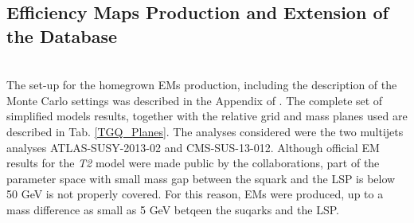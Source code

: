 \documentclass[a4paper,11pt]{article}
\begin{document}
\subsection{Efficiency Maps Production and Extension of the Database}
\\
The set-up for the homegrown EMs production, including the description of the Monte Carlo settings was described in the Appendix of \cite{Ambrogi:2017neo}. The complete set of simplified models results, together with the relative grid and mass planes used are described in Tab. \ref{TGQ_Planes}. The analyses considered were the two multijets analyses ATLAS-SUSY-2013-02 and CMS-SUS-13-012. Although official EM results for the \textit{T2} model were made public by the collaborations, part of the parameter space with small mass gap between the squark and the LSP is below $~$50 GeV is not properly covered. For this reason, EMs were produced, up to a mass difference as small as 5 GeV betqeen the suqarks and the LSP. 
%
\end{document}
